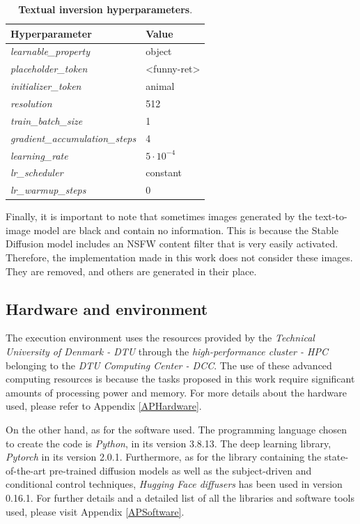 \begin{table}[ht]
\centering
\begin{tabular}{|l|l|}
\hline
\rowcolor[HTML]{AEAAAA} 
\textbf{Hyperparameter} & \textbf{Value} \\ \hline
\textit{learnable\_property} & object \\ \hline
\textit{placeholder\_token} & \textless{}funny-ret\textgreater{} \\ \hline
\textit{initializer\_token} & animal \\ \hline
\textit{resolution} & 512 \\ \hline
\textit{train\_batch\_size} & 1 \\ \hline
\textit{gradient\_accumulation\_steps} & 4 \\ \hline
\textit{learning\_rate} & $5\cdot10^{-4}$ \\ \hline
\textit{lr\_scheduler} & constant \\ \hline
\textit{lr\_warmup\_steps} & 0 \\ \hline
\end{tabular}
\caption{\textbf{Textual inversion hyperparameters}.}
\label{table:TableTextinversionhyperparameters}
\end{table}

Finally, it is important to note that sometimes images generated by the text-to-image model are black and contain no information. This is because the Stable Diffusion model includes an NSFW content filter that is very easily activated. Therefore, the implementation made in this work does not consider these images. They are removed, and others are generated in their place.

\subsection{Hardware and environment}

The execution environment uses the resources provided by the \textit{Technical University of Denmark - DTU} through the \textit{high-performance cluster - HPC} belonging to the \textit{DTU Computing Center - DCC}. The use of these advanced computing resources is because the tasks proposed in this work require significant amounts of processing power and memory. For more details about the hardware used, please refer to Appendix \ref{APHardware}. 

On the other hand, as for the software used. The programming language chosen to create the code is \textit{Python}, in its version 3.8.13. The deep learning library, \textit{Pytorch} in its version 2.0.1. Furthermore, as for the library containing the state-of-the-art pre-trained diffusion models as well as the subject-driven and conditional control techniques, \textit{Hugging Face diffusers} has been used in version 0.16.1. For further details and a detailed list of all the libraries and software tools used, please visit Appendix \ref{APSoftware}.

